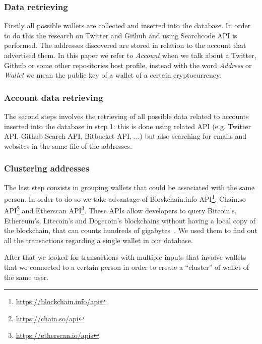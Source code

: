 \subsubsection*{Data retrieving} Firstly all possible wallets are collected
and inserted into the database. In order to do this the research on
Twitter and Github and using Searchcode API is performed. The addresses
discovered are stored in relation to the account that advertised them.
In this paper we refer to \textit{Account} when we talk about a Twitter, Github
or some other repositories host profile, instead with the word \textit{Address}
or \textit{Wallet} we mean the public key of a wallet of a certain
cryptocurrency.
\subsubsection*{Account data retrieving} The second steps involves the
retrieving of all possible data related to accounts inserted into the database
in step 1: this is done using related API (e.g. Twitter API, Github Search API,
Bitbucket API, ...) but also searching for emails and websites in the same file
of the addresses.
\subsubsection*{Clustering addresses} The last step consists in grouping 
wallets that could be associated with the same person. In order to do so we
take advantage of
Blockchain.info API\footnote{\url{https://blockchain.info/api}},
Chain.so API\footnote{\url{https://chain.so/api}} and
Etherscan API\footnote{\url{https://etherscan.io/apis}}. These APIs allow
developers to query Bitcoin's, Ethereum's, Litecoin's and Dogecoin's blockchains without
having a local copy of the blockchain, that can counts hundreds of
gigabytes~\cite{bib:bitinfochart}. We used them to find out all the transactions
regarding a single wallet in our database.

After that we looked for transactions with multiple inputs that
involve wallets that we connected to a certain person in order to create a
``cluster'' of wallet of the same user.
